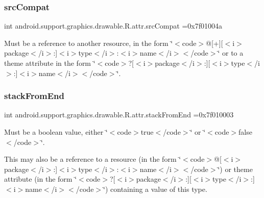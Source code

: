 \subsubsection{\texorpdfstring{src\+Compat}{srcCompat}}
{\footnotesize\ttfamily int android.\+support.\+graphics.\+drawable.\+R.\+attr.\+src\+Compat =0x7f01004a\hspace{0.3cm}{\ttfamily [static]}}

Must be a reference to another resource, in the form \char`\"{}$<$code$>$@\mbox{[}+\mbox{]}\mbox{[}$<$i$>$package$<$/i$>$\+:\mbox{]}$<$i$>$type$<$/i$>$\+:$<$i$>$name$<$/i$>$$<$/code$>$\char`\"{} or to a theme attribute in the form \char`\"{}$<$code$>$?\mbox{[}$<$i$>$package$<$/i$>$\+:\mbox{]}\mbox{[}$<$i$>$type$<$/i$>$\+:\mbox{]}$<$i$>$name$<$/i$>$$<$/code$>$\char`\"{}. \mbox{\label{classandroid_1_1support_1_1graphics_1_1drawable_1_1R_1_1attr_a69b9d8cfb921bb4234e53faddca13058}} 
\subsubsection{\texorpdfstring{stack\+From\+End}{stackFromEnd}}
{\footnotesize\ttfamily int android.\+support.\+graphics.\+drawable.\+R.\+attr.\+stack\+From\+End =0x7f010003\hspace{0.3cm}{\ttfamily [static]}}

Must be a boolean value, either \char`\"{}$<$code$>$true$<$/code$>$\char`\"{} or \char`\"{}$<$code$>$false$<$/code$>$\char`\"{}. 

This may also be a reference to a resource (in the form \char`\"{}$<$code$>$@\mbox{[}$<$i$>$package$<$/i$>$\+:\mbox{]}$<$i$>$type$<$/i$>$\+:$<$i$>$name$<$/i$>$$<$/code$>$\char`\"{}) or theme attribute (in the form \char`\"{}$<$code$>$?\mbox{[}$<$i$>$package$<$/i$>$\+:\mbox{]}\mbox{[}$<$i$>$type$<$/i$>$\+:\mbox{]}$<$i$>$name$<$/i$>$$<$/code$>$\char`\"{}) containing a value of this type. \mbox{\label{classandroid_1_1support_1_1graphics_1_1drawable_1_1R_1_1attr_af03faf6deb8ce110a4db717d7e23e2cd}} 
